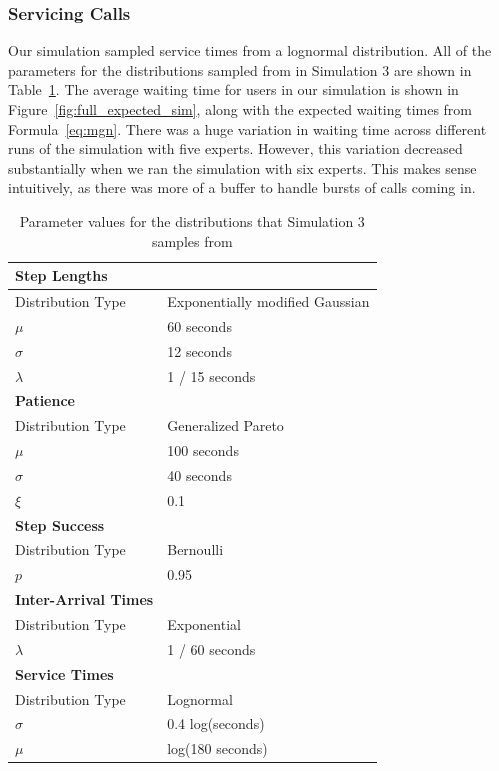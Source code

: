 \subsubsection{Servicing Calls}

Our simulation sampled service times from a lognormal distribution.
All of the parameters for the distributions sampled from in Simulation 3 are
shown in Table~\ref{tab:sim3_params}.
The average waiting time for users in our simulation is shown in
Figure~\ref{fig:full_expected_sim}, along with the expected waiting times from
Formula~\ref{eq:mgn}.
There was a huge variation in waiting time across different runs of the
simulation with five experts.
However, this variation decreased substantially when we ran the simulation with
six experts.
This makes sense intuitively, as there was more of a buffer to handle bursts of
calls coming in.

\begin{table}
  \begin{tabular}{|l|l|}
    \hline
    \textbf{Step Lengths} & \\
    \hline
    Distribution Type & Exponentially modified Gaussian\\
    \hline
    $\mu$ & 60 seconds\\
    \hline
    $\sigma$ & 12 seconds\\
    \hline
    $\lambda$ & 1 / 15 seconds\\
    \hline
    \hline
    \textbf{Patience} & \\
    \hline
    Distribution Type & Generalized Pareto\\
    \hline
    $\mu$ & 100 seconds\\
    \hline
    $\sigma$ & 40 seconds\\
    \hline
    $\xi$ & 0.1\\
    \hline
    \hline
    \textbf{Step Success} & \\
    \hline
    Distribution Type & Bernoulli\\
    \hline
    $p$ & 0.95\\
    \hline
    \hline
    \textbf{Inter-Arrival Times} & \\
    \hline
    Distribution Type & Exponential\\
    \hline
    $\lambda$ & 1 / 60 seconds\\
    \hline
    \hline
    \textbf{Service Times} & \\
    \hline
    Distribution Type & Lognormal\\
    \hline
    $\sigma$ & 0.4 log(seconds)\\
    \hline
    $\mu$ & log(180 seconds)\\
    \hline
  \end{tabular}
  \caption{
    Parameter values for the distributions that Simulation 3 samples from
  }\label{tab:sim3_params}
\end{table}

